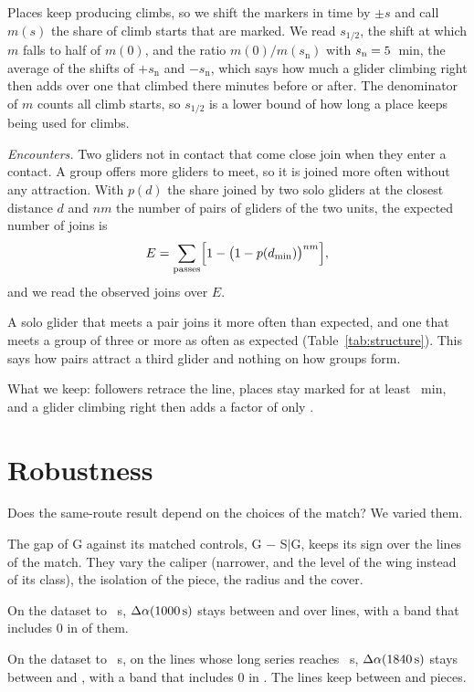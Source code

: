 \documentclass[aps,prl,twocolumn,superscriptaddress,nofootinbib]{revtex4-2}
\newcommand{\aK}{\alpha(\LtLagOne\,\mathrm{s})}
\newcommand{\aQ}{\alpha(\LtLagTwo\,\mathrm{s})}
\begin{document}
Places keep producing climbs, so we shift the markers in time by $\pm s$ and call $m(s)$ the share of
climb starts that are marked. We read $s_{1/2}$, the shift at which $m$ falls to half of $m(0)$, and
the ratio $m(0)/m(s_\mathrm{n})$ with $s_\mathrm{n} = 5$~min, the average of the shifts of
$+s_\mathrm{n}$ and $-s_\mathrm{n}$, which says how much a glider climbing right then adds over one
that climbed there minutes before or after. The denominator of $m$ counts all climb starts, so
$s_{1/2}$ is a lower bound of how long a place keeps being used for climbs.

\emph{Encounters.} Two gliders not in contact that come close join when they enter a contact. A group
offers more gliders to meet, so it is joined more often without any attraction. With $p(d)$ the share
joined by two solo gliders at the closest distance $d$ and $nm$ the number of pairs of gliders of the
two units, the expected number of joins is
\begin{equation}
E = \sum_\mathrm{passes} \Bigl[ 1 - \bigl(1 - p(d_\mathrm{min})\bigr)^{nm} \Bigr] ,
\end{equation}
and we read the observed joins over $E$.

A solo glider that meets a pair joins it more often than expected, and one that meets a group of three
or more as often as expected (Table~\ref{tab:structure}). This says how pairs attract a third glider
and nothing on how groups form.


What we keep: followers retrace the line, places stay marked for at least \StMkHalfGroup~min, and a
glider climbing right then adds a factor of only \StMkNowGroup.

\section{Robustness}\label{sm:robust}

Does the same-route result depend on the choices of the match? We varied them.

The gap of G against its matched controls, G $-$ S$|$G, keeps its sign over the \LtRobLines{} lines of
the match. They vary the caliper (narrower, and the level of the wing instead of its class), the
isolation of the piece, the radius and the cover.

On the dataset to \LtTauOne~s, $\Delta\aK$ stays between \LtRobLowK{} and \LtRobHighK{} over
\LtRobLinesK{} lines, with a band that includes 0 in \LtRobZeroK{} of them.

On the dataset to \LtTauTwo~s, on the \LtRobLinesQ{} lines whose long series reaches \LtLagTwo~s,
$\Delta\aQ$ stays between \LtRobLowQ{} and \LtRobHighQ, with a band that includes 0 in \LtRobZeroQ.
The lines keep between \LtRobPiecesLow{} and \LtRobPiecesHigh{} pieces.
\end{document}
